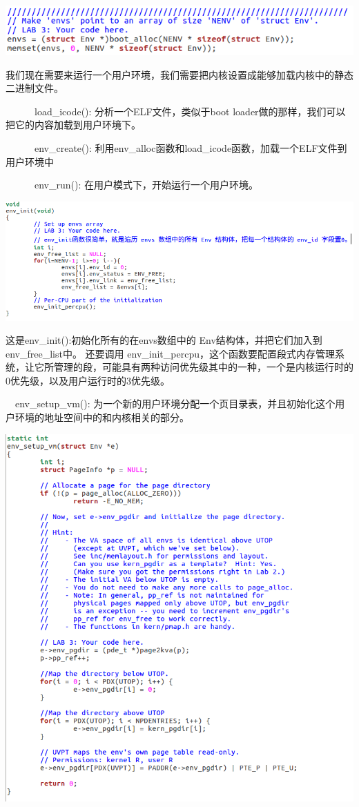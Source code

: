 \begin{ExerciseList}
  \includegraphics[width=6in]{figures/lab2/image53.png}

我们现在需要来运行一个用户环境，我们需要把内核设置成能够加载内核中的静态二进制文件。



　　　load\_icode(): 分析一个ELF文件，类似于boot loader做的那样，我们可以把它的内容加载到用户环境下。

　　　env\_create(): 利用env\_alloc函数和load\_icode函数，加载一个ELF文件到用户环境中

　　　env\_run(): 在用户模式下，开始运行一个用户环境。

  \includegraphics[width=6in]{figures/lab2/image54.png}

这是env\_init():初始化所有的在envs数组中的 Env结构体，并把它们加入到 env\_free\_list中。 还要调用 env\_init\_percpu，这个函数要配置段式内存管理系统，让它所管理的段，可能具有两种访问优先级其中的一种，一个是内核运行时的0优先级，以及用户运行时的3优先级。

　env\_setup\_vm(): 为一个新的用户环境分配一个页目录表，并且初始化这个用户环境的地址空间中的和内核相关的部分。

  \includegraphics[width=6in]{figures/lab2/image55.png}


\end{ExerciseList}
